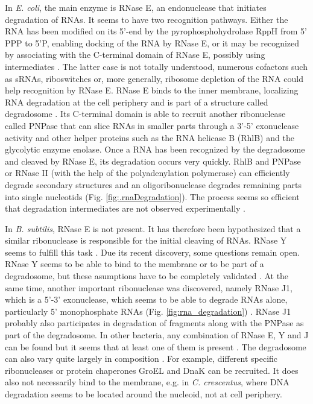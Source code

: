 In \textit{E. coli}, the main enzyme is RNase E, an endonuclease that initiates degradation of RNAs. It seems to have two recognition pathways. Either the RNA has been modified on its 5'-end by the pyrophosphohydrolase RppH from 5' PPP to 5'P, enabling docking of the RNA by RNase E, or it may be recognized by associating with the C-terminal domain of RNase E, possibly using intermediates \citep{laalami_initiation_2013}. The latter case is not totally understood, numerous cofactors such as sRNAs, riboswitches or, more generally, ribosome depletion of the RNA could help recognition by RNase E. RNase E binds to the inner membrane, localizing RNA degradation at the cell periphery and is part of a structure called degradosome \citep{bechhofer_bacillus_2011,laalami_initiation_2013,bandyra_social_2013}. Its C-terminal domain is able to recruit another ribonuclease called PNPase that can slice RNAs in smaller parts through a 3'-5' exonuclease activity and other helper proteins such as the RNA helicase B (RhlB) and the glycolytic enzyme enolase. Once a RNA has been recognized by the degradosome and cleaved by RNase E, its degradation occurs very quickly. RhlB and PNPase or RNase II (with the help of the polyadenylation polymerase) can efficiently degrade secondary structures and an oligoribonuclease degrades remaining parts into single nucleotids (Fig. \ref{fig:.rnaDegradation}). The process seems so efficient that degradation intermediates are not observed experimentally \citep{hambraeus_genome-wide_2003}.

In \textit{B. subtilis}, RNase E is not present. It has therefore been hypothesized that a similar ribonuclease is responsible for the initial cleaving of RNAs. RNase Y seems to fulfill this task \citep{lehnik-harbrink_RNA_2012,bechhofer_bacillus_2011,laalami_initiation_2013}. Due its recent discovery, some questions remain open. RNase Y seems to be able to bind to the membrane or to be part of a degradosome, but these asumptions have to be completely validated \citep{laalami_initiation_2013}. At the same time, another important ribonuclease was discovered, namely RNase J1, which is a 5'-3' exonuclease, which seems to be able to degrade RNAs alone, particularly 5' monophosphate RNAs (Fig. \ref{fig:rna_degradation}) \citep{lehnik-harbrink_RNA_2012,bechhofer_bacillus_2011,laalami_initiation_2013}. RNase J1 probably also participates in degradation of fragments along with the PNPase as part of the degradosome. In other bacteria, any combination of RNase E, Y and J can be found but it seems that at least one of them is present \citep{archambault_measurements_2013}. The degradosome can also vary quite largely in composition \citep{laalami_initiation_2013}. For example, different specific ribonucleases or protein chaperones GroEL and DnaK can be recruited. It does also not necessarily bind to the membrane, e.g. in \textit{C. crescentus}, where DNA degradation seems to be located around the nucleoid, not at cell periphery.

